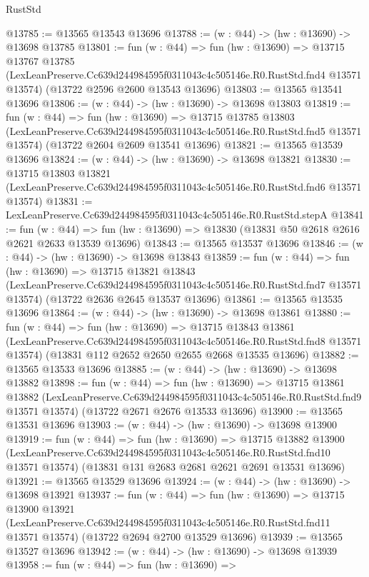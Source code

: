 \begin{lexlean}{RustStd}
\begin{coremodule}
@13785 := @13565 @13543 @13696
@13788 := (w : @44) -> (hw : @13690) -> @13698 @13785
@13801 := fun (w : @44) =>
  fun (hw : @13690) =>
  @13715
    @13767
    @13785
    (LexLeanPreserve.Cc639d244984595f0311043c4c505146e.R0.RustStd.fnd4 @13571 @13574)
    (@13722 @2596 @2600 @13543 @13696)
@13803 := @13565 @13541 @13696
@13806 := (w : @44) -> (hw : @13690) -> @13698 @13803
@13819 := fun (w : @44) =>
  fun (hw : @13690) =>
  @13715
    @13785
    @13803
    (LexLeanPreserve.Cc639d244984595f0311043c4c505146e.R0.RustStd.fnd5 @13571 @13574)
    (@13722 @2604 @2609 @13541 @13696)
@13821 := @13565 @13539 @13696
@13824 := (w : @44) -> (hw : @13690) -> @13698 @13821
@13830 := @13715
    @13803
    @13821
    (LexLeanPreserve.Cc639d244984595f0311043c4c505146e.R0.RustStd.fnd6 @13571 @13574)
@13831 := LexLeanPreserve.Cc639d244984595f0311043c4c505146e.R0.RustStd.stepA
@13841 := fun (w : @44) =>
  fun (hw : @13690) => @13830 (@13831 @50 @2618 @2616 @2621 @2633 @13539 @13696)
@13843 := @13565 @13537 @13696
@13846 := (w : @44) -> (hw : @13690) -> @13698 @13843
@13859 := fun (w : @44) =>
  fun (hw : @13690) =>
  @13715
    @13821
    @13843
    (LexLeanPreserve.Cc639d244984595f0311043c4c505146e.R0.RustStd.fnd7 @13571 @13574)
    (@13722 @2636 @2645 @13537 @13696)
@13861 := @13565 @13535 @13696
@13864 := (w : @44) -> (hw : @13690) -> @13698 @13861
@13880 := fun (w : @44) =>
  fun (hw : @13690) =>
  @13715
    @13843
    @13861
    (LexLeanPreserve.Cc639d244984595f0311043c4c505146e.R0.RustStd.fnd8 @13571 @13574)
    (@13831 @112 @2652 @2650 @2655 @2668 @13535 @13696)
@13882 := @13565 @13533 @13696
@13885 := (w : @44) -> (hw : @13690) -> @13698 @13882
@13898 := fun (w : @44) =>
  fun (hw : @13690) =>
  @13715
    @13861
    @13882
    (LexLeanPreserve.Cc639d244984595f0311043c4c505146e.R0.RustStd.fnd9 @13571 @13574)
    (@13722 @2671 @2676 @13533 @13696)
@13900 := @13565 @13531 @13696
@13903 := (w : @44) -> (hw : @13690) -> @13698 @13900
@13919 := fun (w : @44) =>
  fun (hw : @13690) =>
  @13715
    @13882
    @13900
    (LexLeanPreserve.Cc639d244984595f0311043c4c505146e.R0.RustStd.fnd10 @13571 @13574)
    (@13831 @131 @2683 @2681 @2621 @2691 @13531 @13696)
@13921 := @13565 @13529 @13696
@13924 := (w : @44) -> (hw : @13690) -> @13698 @13921
@13937 := fun (w : @44) =>
  fun (hw : @13690) =>
  @13715
    @13900
    @13921
    (LexLeanPreserve.Cc639d244984595f0311043c4c505146e.R0.RustStd.fnd11 @13571 @13574)
    (@13722 @2694 @2700 @13529 @13696)
@13939 := @13565 @13527 @13696
@13942 := (w : @44) -> (hw : @13690) -> @13698 @13939
@13958 := fun (w : @44) =>
  fun (hw : @13690) =>

\end{coremodule}
\end{lexlean}
